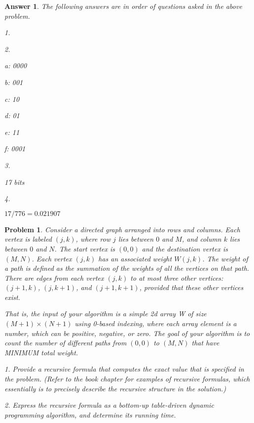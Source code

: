 \documentclass[11pt]{article}
\newtheorem{problem}{Problem}
\newtheorem{answer}{Answer}
\begin{document}
\begin{answer}
\label{ans:2}
The following answers are in order of questions asked in the above problem.

1. 
\begin{center}
\end{center}

2.

a: 0000

b: 001

c: 10

d: 01

e: 11

f: 0001

\bigskip

3.

17 bits

\bigskip

4.

$17/776 = 0.021907$
\end{answer}

\bigskip

\begin{problem}
\label{prob:3}
Consider a directed graph arranged into rows and columns. Each vertex is labeled
$(j, k)$, where row $j$ lies between $0$ and $M$, and column $k$ lies between $0$ and $N$. The start vertex is $(0, 0)$ and the destination vertex is $(M,N)$. Each vertex $(j, k)$ has an associated weight $W(j, k)$. The weight of a path is defined as the summation of the weights of all the vertices on that path. There are edges from each vertex $(j, k)$ to at most three other vertices: $(j + 1, k)$, $(j, k + 1)$, and $(j + 1, k + 1)$, provided that these other vertices exist.

That is, the input of your algorithm is a simple 2d array W of size $(M + 1) × (N + 1)$ using 0-based indexing, where each array element is a number, which can be positive, negative, or zero. The goal of your algorithm is to count the number of different paths from $(0, 0)$ to $(M, N)$ that have MINIMUM total weight.

1. Provide a recursive formula that computes the exact value that is specified in the problem. (Refer to the book chapter for examples of recursive formulas, which essentially is to precisely describe the recursive structure in the solution.)

2. Express the recursive formula as a bottom-up table-driven dynamic programming
algorithm, and determine its running time.
\end{problem}
\end{document}
